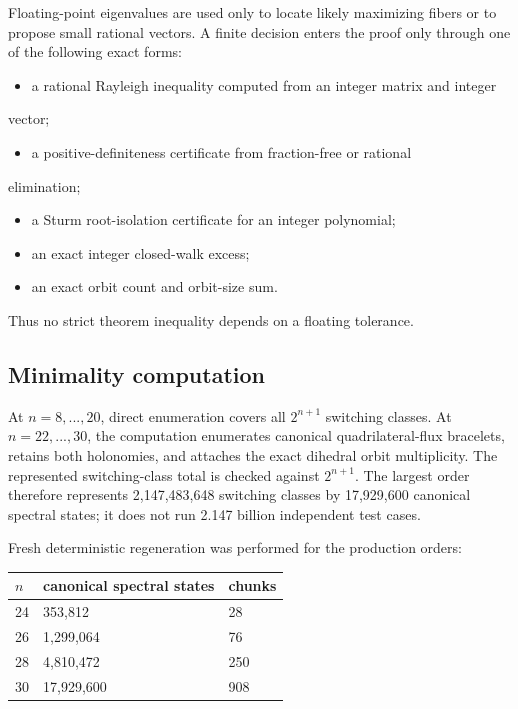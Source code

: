 Floating-point eigenvalues are used only to locate likely maximizing fibers or
to propose small rational vectors. A finite decision enters the proof only
through one of the following exact forms:

\begin{itemize}
\item a rational Rayleigh inequality computed from an integer matrix and integer
\end{itemize}
  vector;
\begin{itemize}
\item a positive-definiteness certificate from fraction-free or rational
\end{itemize}
  elimination;
\begin{itemize}
\item a Sturm root-isolation certificate for an integer polynomial;
\item an exact integer closed-walk excess;
\item an exact orbit count and orbit-size sum.
\end{itemize}

Thus no strict theorem inequality depends on a floating tolerance.

\subsection{Minimality computation}

At \(n=8,...,20\), direct enumeration covers all \(2^{n+1}\) switching classes.
At \(n=22,...,30\), the computation enumerates canonical quadrilateral-flux
bracelets, retains both holonomies, and attaches the exact dihedral orbit
multiplicity. The represented switching-class total is checked against
\(2^{n+1}\). The largest order therefore represents 2,147,483,648 switching
classes by 17,929,600 canonical spectral states; it does not run 2.147 billion
independent test cases.

Fresh deterministic regeneration was performed for the production orders:

\begin{center}
\begin{tabular}{lll}
\toprule
\(n\) & canonical spectral states & chunks \\
\midrule
24 & 353,812 & 28 \\
26 & 1,299,064 & 76 \\
28 & 4,810,472 & 250 \\
30 & 17,929,600 & 908 \\
\bottomrule
\end{tabular}%
\end{center}

